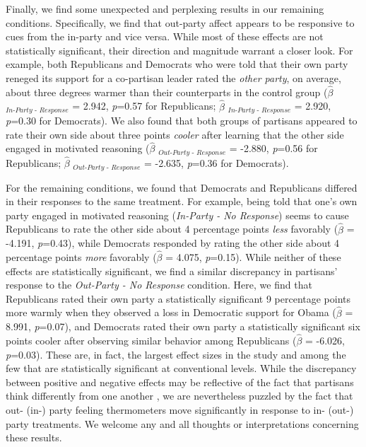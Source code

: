 \documentclass[12pt, letterpaper]{article}
\begin{document}
Finally, we find some unexpected and perplexing results in our remaining conditions. Specifically, we find that out-party affect appears to be responsive to cues from the in-party and vice versa. While most of these effects are not statistically significant, their direction and magnitude warrant a closer look. For example, both Republicans and Democrats who were told that their own party reneged its support for a co-partisan leader rated the \textit{other party}, on average, about three degrees warmer than their counterparts in the control group ($\hat{\beta}$ $_{\textit{In-Party - Response}}$ = 2.942, \textit{p}=0.57 for Republicans; $\hat{\beta}$ $_{\textit{In-Party - Response}}$ = 2.920, \textit{p}=0.30 for Democrats). We also found that both groups of partisans appeared to rate their own side about three points \textit{cooler} after learning that the other side engaged in motivated reasoning ($\hat{\beta}$ $_{\textit{Out-Party - Response}}$ = -2.880, \textit{p}=0.56 for Republicans; $\hat{\beta}$ $_{\textit{Out-Party - Response}}$ = -2.635, \textit{p}=0.36 for Democrats). 

For the remaining conditions, we found that Democrats and Republicans differed in their responses to the same treatment. For example, being told that one's own party engaged in motivated reasoning (\textit{In-Party - No Response}) seems to cause Republicans to rate the other side about 4 percentage points \textit{less} favorably ($\hat{\beta}$ = -4.191, \textit{p}=0.43), while Democrats responded by rating the other side about 4 percentage points \textit{more} favorably ($\hat{\beta}$ = 4.075, \textit{p}=0.15). While neither of these effects are statistically significant, we find a similar discrepancy in partisans' response to the \textit{Out-Party - No Response} condition. Here, we find that Republicans rated their own party a statistically significant 9 percentage points more warmly when they observed a loss in Democratic support for Obama ($\hat{\beta}$ = 8.991, \textit{p}=0.07), and Democrats rated their own party a statistically significant six points cooler after observing similar behavior among Republicans ($\hat{\beta}$ = -6.026, \textit{p}=0.03). These are, in fact, the largest effect sizes in the study and among the few that are statistically significant at conventional levels. While the discrepancy between positive and negative effects may be reflective of the fact that partisans think differently from one another \citep{grossmanhopkins_2016}, we are nevertheless puzzled by the fact that out- (in-) party feeling thermometers move significantly in response to in- (out-) party treatments. We welcome any and all thoughts or interpretations concerning these results. 
\end{document}
